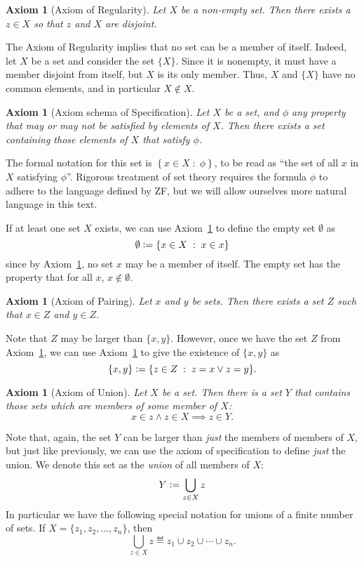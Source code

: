 \documentclass[a4paper, twoside, notitlepage, 11pt]{article}
\theoremstyle{plain}
\newtheorem{ax}[prop]{Axiom}
\theoremstyle{definition}
\theoremstyle{remark}
\numberwithin{equation}{section}
\begin{document}
\begin{ax}[Axiom of Regularity] \label{ax:reg}
Let $X$ be a non-empty set. Then there exists a $z \in X$ so that $z$ and $X$ are disjoint.
\end{ax}

The Axiom of Regularity implies that no set can be a member of itself. Indeed, let $X$ be a set and consider
the set $\{X\}$. Since it is nonempty, it must have a member disjoint from itself, but $X$ is its only member.
Thus, $X$ and $\{X\}$ have no common elements, and in particular $X \not\in X$.

\begin{ax}[Axiom schema of Specification] \label{ax:spec}
Let $X$ be a set, and $\phi$ any property that may or may not be satisfied by elements of $X$. Then there
exists a set containing those elements of $X$ that satisfy $\phi$.
\end{ax}

The formal notation for this set is $\left\{ x \in X \;:\; \phi \right\}$, to be read as ``the set of all $x$
in $X$ satisfying $\phi$''. Rigorous treatment of set theory requires the formula $\phi$ to adhere to the
language defined by ZF, but we will allow ourselves more natural language in this text.

If at least one set $X$ exists, we can use Axiom~\ref{ax:spec} to define the empty set $\emptyset$ as
\[
    \emptyset \vcentcolon= \left\{ x \in X \;:\; x \in x \right\}
\]
since by Axiom~\ref{ax:reg}, no set $x$ may be a member of itself. The empty set has the property that for all
$x$, $x\not\in\emptyset$.

\begin{ax}[Axiom of Pairing] \label{ax:pair}
Let $x$ and $y$ be sets. Then there exists a set $Z$ such that $x\in Z$ and $y\in Z$.
\end{ax}

Note that $Z$ may be larger than $\{x,y\}$. However, once we have the set $Z$ from Axiom~\ref{ax:pair}, we can
use Axiom~\ref{ax:spec} to give the existence of $\{x,y\}$ as
\[
    \{x,y\} \vcentcolon= \{ z \in Z \;:\; z=x \vee z=y \}.
\]

\begin{ax}[Axiom of Union] \label{ax:union}
Let $X$ be a set. Then there is a set $Y$ that contains those sets which are members of some member of $X$:
\[
    x \in z \wedge z \in X \implies z \in Y.
\]
\end{ax}

Note that, again, the set $Y$ can be larger than {\em just} the members of members of $X$, but just like
previously, we can use the axiom of specification to define {\em just} the union. We denote this set as the
{\em union} of all members of $X$: 
\[
    Y \vcentcolon= \bigcup_{z \in X} z
\]
In particular we have the following special notation for unions of a finite number of sets. If
$X=\{z_1,z_2,\ldots,z_n\}$, then 
\[
    \bigcup_{z \in X} z \eqdef z_1 \cup z_2 \cup \cdots \cup z_n.
\]
\end{document}
